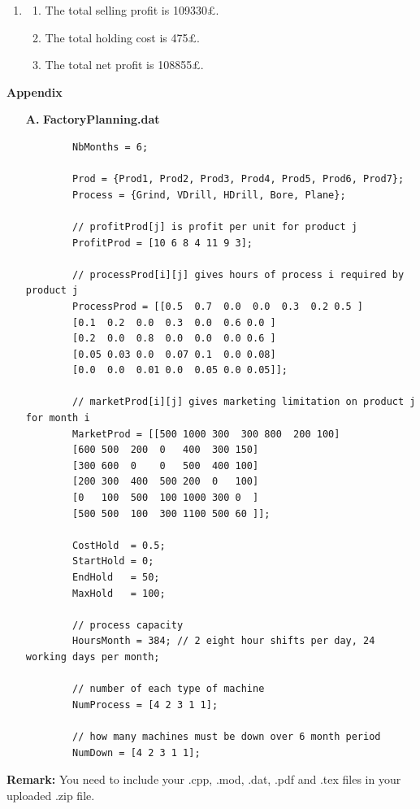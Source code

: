 \documentclass[12pt,a4paper]{article}
\makeatletter
\newtheorem*{solution}{Solution}
\theoremstyle{definition}
\renewenvironment{solution}[1][Solution] {\par\pushQED{\qed}\normalfont\topsep6\p@\@plus6\p@\relax\trivlist\item[\hskip\labelsep\bfseries#1\@addpunct{.}]\ignorespaces}{\popQED\endtrivlist\@endpefalse} \makeatother
\makeatother
\begin{document}
\begin{enumerate}
\begin{solution}
\begin{enumerate}
\begin{enumerate}
\begin{enumerate}
        \end{enumerate}
        \newpage
        \item
        The total selling profit is 109330\pounds.
        \item
        The total holding cost is 475\pounds.
        \item
        The total net profit is 108855\pounds.
        \end{enumerate}
    \end{enumerate}

    \end{solution}

\end{enumerate}
\newpage
\vspace{20pt}

{\noindent\large\textbf{Appendix}}
\begin{enumerate}
	\item [\textbf{A.}]
	\textbf{FactoryPlanning.dat}
	\begin{lstlisting}
		NbMonths = 6;
		
		Prod = {Prod1, Prod2, Prod3, Prod4, Prod5, Prod6, Prod7};
		Process = {Grind, VDrill, HDrill, Bore, Plane};
		
		// profitProd[j] is profit per unit for product j
		ProfitProd = [10 6 8 4 11 9 3];
		
		// processProd[i][j] gives hours of process i required by product j
		ProcessProd = [[0.5  0.7  0.0  0.0  0.3  0.2 0.5 ]
		[0.1  0.2  0.0  0.3  0.0  0.6 0.0 ]
		[0.2  0.0  0.8  0.0  0.0  0.0 0.6 ]
		[0.05 0.03 0.0  0.07 0.1  0.0 0.08]
		[0.0  0.0  0.01 0.0  0.05 0.0 0.05]];
		
		// marketProd[i][j] gives marketing limitation on product j for month i
		MarketProd = [[500 1000 300  300 800  200 100]
		[600 500  200  0   400  300 150]
		[300 600  0    0   500  400 100]
		[200 300  400  500 200  0   100]
		[0   100  500  100 1000 300 0  ]
		[500 500  100  300 1100 500 60 ]];
		
		CostHold  = 0.5;
		StartHold = 0;
		EndHold   = 50;
		MaxHold   = 100;
		
		// process capacity
		HoursMonth = 384; // 2 eight hour shifts per day, 24 working days per month;
		
		// number of each type of machine
		NumProcess = [4 2 3 1 1];
		
		// how many machines must be down over 6 month period
		NumDown = [4 2 3 1 1];
	\end{lstlisting}
\end{enumerate}

\textbf{Remark:} You need to include your .cpp, .mod, .dat, .pdf and .tex files in your uploaded .zip file.

\end{document}
